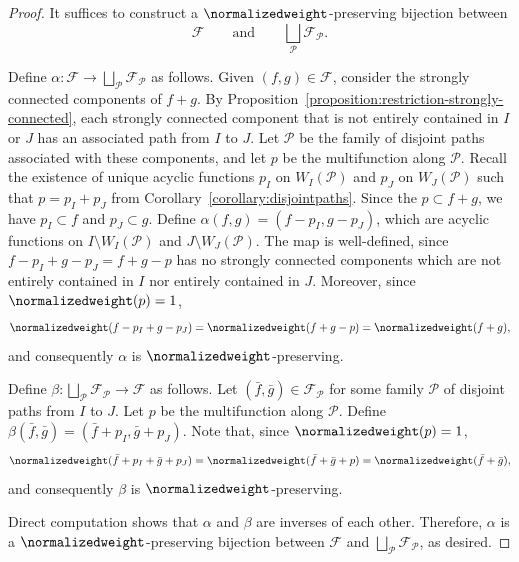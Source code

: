 \begin{proof}
    It suffices to construct a \(\normalizedweight\)-preserving bijection between
    \begin{equation*}
        \mathcal{F} 
        \qquad \text{and} \qquad 
        \bigsqcup_{\mathcal{P}} \mathcal{F}_{\mathcal{P}}.
    \end{equation*}

    Define \(\alpha \colon \mathcal{F} \to \bigsqcup_{\mathcal{P}} \mathcal{F}_{\mathcal{P}}\) as follows.
    Given \((f, g) \in \mathcal{F}\),
    consider the strongly connected components of \(f+g\).
    By Proposition~\ref{proposition:restriction-strongly-connected},
    each strongly connected component that is not entirely contained in \(I\) or \(J\) has an associated path from \(I\) to \(J\).
    Let \(\mathcal{P}\) be the family of disjoint paths associated with these components,
    and let \(p\) be the multifunction along \(\mathcal{P}\).
    Recall the existence of unique acyclic functions \(p_I\) on \(W_I(\mathcal{P})\) and \(p_J\) on \(W_J(\mathcal{P})\) such that \(p = p_I + p_J\) from Corollary~\ref{corollary:disjointpaths}.
    Since the \(p \subset f+g\), we have \(p_I \subset f\) and \(p_J \subset g\).
    Define \(\alpha(f, g) = (f - p_I, g - p_J)\), which are acyclic functions on \(I \setminus W_I(\mathcal{P})\) and \(J \setminus W_J(\mathcal{P})\).
    The map is well-defined, since \(f - p_I + g - p_J = f + g - p\) has no strongly connected components which are not entirely contained in \(I\) nor entirely contained in \(J\).
    Moreover, since \(\normalizedweight(p) = 1\),
    \begin{equation*}
        \normalizedweight(f - p_I + g - p_J) = \normalizedweight(f + g - p) = \normalizedweight(f + g),
    \end{equation*}
    and consequently \(\alpha\) is \(\normalizedweight\)-preserving.

    Define \(\beta \colon \bigsqcup_{\mathcal{P}} \mathcal{F}_{\mathcal{P}} \to \mathcal{F}\) as follows.
    Let \((\bar{f}, \bar{g}) \in \mathcal{F}_{\mathcal{P}}\) for some family \(\mathcal{P}\) of disjoint paths from \(I\) to \(J\).
    Let \(p\) be the multifunction along \(\mathcal{P}\).
    Define \(\beta(\bar{f}, \bar{g}) = (\bar{f} + p_I, \bar{g} + p_J)\).
    Note that, since \(\normalizedweight(p) = 1\),
    \begin{equation*}
        \normalizedweight(\bar{f} + p_I + \bar{g} + p_J) = \normalizedweight(\bar{f} + \bar{g} + p) = \normalizedweight(\bar{f} + \bar{g}),
    \end{equation*}
    and consequently \(\beta\) is \(\normalizedweight\)-preserving.

    Direct computation shows that \(\alpha\) and \(\beta\) are inverses of each other.
    Therefore, \(\alpha\) is a \(\normalizedweight\)-preserving bijection between \(\mathcal{F}\) and \(\bigsqcup_{\mathcal{P}} \mathcal{F}_{\mathcal{P}}\), as desired.
\end{proof}


